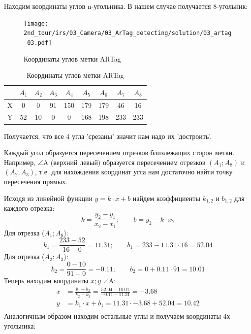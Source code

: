Находим координаты углов n-угольника. В нашем случае получается 8-угольник:
\begin{figure}[h!]
	\centering
	\texttt{[image: 2nd\_tour/irs/03\_Camera/03\_ArTag\_detecting/solution/03\_artag\_03.pdf]}
	\caption{Координаты углов метки ARTag}
	\label{fig:03_artag_03}
\end{figure}

\begin{table}[h!]
	\begin{center}
		\begin{tabular}{|c|c|c|c|c|c|c|c|c|}		
			\hline 
			& $A_1$ & $A_2$ & $A_3$ & $A_4$ & $A_5$ & $A_6$ & $A_7$ & $A_8$ \\ 
			\hline 
			X & 0 & 0 & 91 & 150 & 179 & 179 & 46 & 16 \\ 
			\hline 
			Y & 52 & 10 & 0 & 0 & 168 & 198 & 233 & 233 \\ 
			\hline 
		\end{tabular} 
		\caption{Координаты углов метки ARTag}
	\end{center}
\end{table}


Получается, что все 4 угла 'срезаны' значит нам надо их 'достроить'.

Каждый угол образуется пересечением отрезков близлежащих сторон метки. Например, $\angle$A (верхний левый) образуется пересечением отрезков $(A_1; A_8)$ и $(A_2; A_3)$, т.е. для нахождения координат угла нам достаточно найти точку пересечения прямых.

Исходя из линейной функции $y = k \cdot x + b$ найдем коэффициенты $k_{1,2}$ и $b_{1,2}$ для каждого отрезка:
\begin{equation*}
k=\frac{y_2-y_1}{x_2-x_1}; \qquad
b = y_2 - k \cdot x_2
\end{equation*}
Для отрезка ($A_1; A_8$):
\begin{equation*}
k_1=\frac{233-52}{16-0} = 11.31; \qquad
b_1 = 233 - 11.31 \cdot 16 = 52.04
\end{equation*}
Для отрезка ($A_2; A_3$):
\begin{equation*}
k_2 = \frac{0-10}{91-0} = -0.11; \qquad
b_2 = 0 + 0.11 \cdot 91 = 10.01
\end{equation*}
Теперь находим координаты $x; y$ $\angle$A:
\begin{equation*}
\begin{aligned}
x & = \frac{b_1-b_2}{k_2-k_1} =  \frac{52.04-10.01}{-0.11 - 11.31} = -3.68 \\
y &= k_1 \cdot x + b_1 = 11.31 \cdot -3.68 + 52.04 = 10.42 \\		
\end{aligned}
\end{equation*}
Аналогичным образом находим остальные углы и получаем координаты 4х угольника:\\

